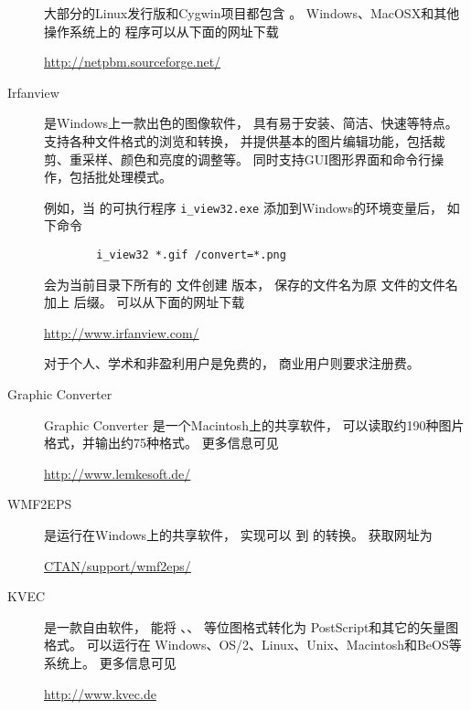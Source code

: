 \begin{description}
	大部分的Linux发行版和Cygwin项目都包含 。
	Windows、MacOSX和其他操作系统上的  程序可以从下面的网址下载
	\begin{center}
		\url{http://netpbm.sourceforge.net/}
	\end{center}
	
	\item[Irfanview]
	
	 是Windows上一款出色的图像软件，
	具有易于安装、简洁、快速等特点。
	 支持各种文件格式的浏览和转换，
	并提供基本的图片编辑功能，包括裁剪、重采样、颜色和亮度的调整等。
	 同时支持GUI图形界面和命令行操作，包括批处理模式。
	
	例如，当 的可执行程序 \verb|i_view32.exe| 添加到Windows的环境变量后，
	如下命令
\begin{verbatim}
		i_view32 *.gif /convert=*.png
\end{verbatim}
	会为当前目录下所有的  文件创建  版本，
	保存的文件名为原  文件的文件名加上  后缀。
	 可以从下面的网址下载
	\begin{center}
		\url{http://www.irfanview.com/}
	\end{center}
	 对于个人、学术和非盈利用户是免费的，
	商业用户则要求注册费。
	
	\item[Graphic Converter]
	
	Graphic Converter 是一个Macintosh上的共享软件，
	可以读取约190种图片格式，并输出约75种格式。
	更多信息可见
	\begin{center}
		\url{http://www.lemkesoft.de/}
	\end{center}
	
	\item[WMF2EPS]
	
	 是运行在Windows上的共享软件，
	实现可以  到  的转换。
	获取网址为
	\begin{center}
		\href{http://www.ctan.org/tex-archive/support/wmf2eps}{CTAN/support/wmf2eps/}
	\end{center}
	
	\item[KVEC]
	
	 是一款自由软件，
	能将 、、 等位图格式转化为 PostScript和其它的矢量图格式。
	 可以运行在 Windows、OS/2、Linux、Unix、Macintosh和BeOS等系统上。
	更多信息可见
	\begin{center}
		\url{http://www.kvec.de}
	\end{center}
	

\end{description}
